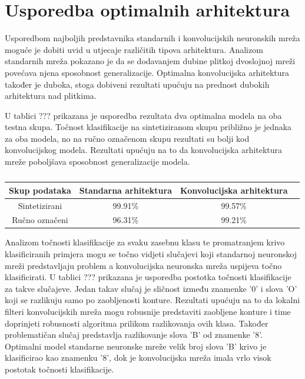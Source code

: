 \documentclass[lmodern, utf8, diplomski, numeric]{fer}
\begin{document}
\section{Usporedba optimalnih arhitektura}

Usporedbom najboljih predstavnika standarnih i konvolucijskih neuronskih mreža moguće je dobiti uvid u utjecaje različitih tipova arhitektura. Analizom standarnih mreža pokazano je da se dodavanjem dubine plitkoj dvoslojnoj mreži povećava njena sposobnost generalizacije. Optimalna konvolucijska arhitektura također je duboka, stoga dobiveni rezultati upućuju na prednost dubokih arhitektura nad plitkima. 

U tablici ??? prikazana je usporedba rezultata dva optimalna modela na oba testna skupa. Točnost klasifikacije na sintetiziranom skupu približno je jednaka za oba modela, no na ručno označenom skupu rezultati su bolji kod konvolucijskog modela. Rezultati upućuju na to da konvolucijska arhitektura mreže poboljšava sposobnost generalizacije modela.  

\begin{table}[ht!]
\begin{center}
\centering
    \begin{tabular}{ | c| c| c|c |}
    \hline    		
    Skup podataka & Standarna arhitektura & Konvolucijska arhitektura \\ \hline
    Sintetizirani & 99.91\% & 99.57\%  \\ \hline
    Ručno označeni & 96.31\% & 	99.21\%  \\
    \hline
    \end{tabular}
\end{center}
\caption{}
\end{table}

Analizom točnosti klasifikacije za svaku zasebnu klasu te promatranjem krivo klasificiranih primjera mogu se točno vidjeti slučajevi koji standarnoj neuronskoj mreži predstavljaju problem a konvolucijska neuronska mreža uspijeva točno klasificirati. U tablici  ??? prikazana je usporedba postotka točnosti klasifikacije za takve slučajeve. Jedan takav slučaj je sličnost između znamenke '0' i slova 'O' koji se razlikuju samo po zaobljenosti konture. Rezultati upućuju na to da lokalni filteri konvolucijskih mreža mogu robusnije predstaviti zaobljene konture i time doprinjeti robusnosti algoritma prilikom razlikovanja ovih klasa. Također problematičan slučaj predstavlja razlikovanje slova 'B' od znamenke '8'. Optimalni model standarne neuronske mreže velik broj slova 'B' krivo je klasificirao kao znamenku '8', dok je konvolucijska mreža imala vrlo visok postotak točnosti klasifikacije.
\end{document}
